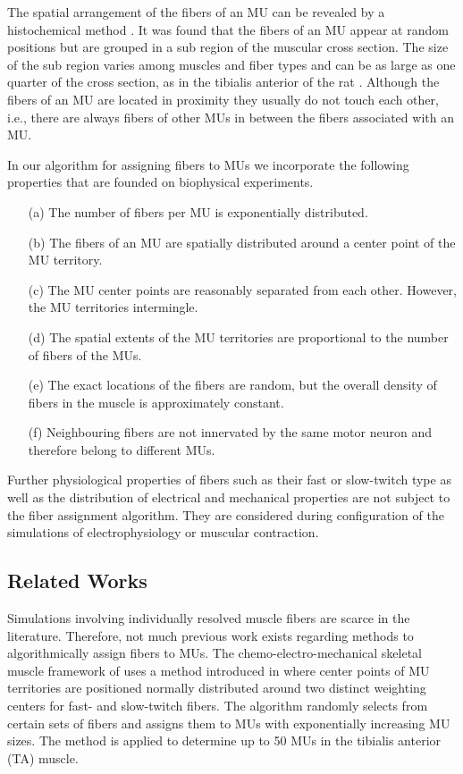 The spatial arrangement of the fibers of an MU can be revealed by a histochemical method \cite{brandstater1969histochemical}. It was found that the fibers of an MU appear at random positions but are grouped in a sub region of the muscular cross section. The size of the sub region varies among muscles and fiber types and can be as large as one quarter of the cross section, as in the tibialis anterior of the rat \cite{Edstrom1968}. Although the fibers of an MU are located in proximity they usually do not touch each other, i.e., there are always fibers of other MUs in between the fibers associated with an MU.

In our algorithm for assigning fibers to MUs we incorporate the following properties that are founded on biophysical experiments. 
\begin{itemize}
\item[(a)] The number of fibers per MU is  exponentially distributed. 
\item[(b)] The fibers of an MU are spatially distributed around a center point of the MU territory.
\item[(c)] The MU center points are reasonably separated from each other. However, the MU territories intermingle. 
\item[(d)] The spatial extents of the MU territories are proportional to the number of fibers of the MUs. 
\item[(e)] The exact locations of the fibers are random, but the overall density of fibers in the muscle is approximately constant. 
\item[(f)] Neighbouring fibers are not innervated by the same motor neuron and therefore belong to different MUs.
\end{itemize}

Further physiological properties of fibers such as their fast or slow-twitch type as well as the distribution of electrical and mechanical properties are not subject to the fiber assignment algorithm. They are considered during configuration of the simulations of electrophysiology or muscular contraction.

\subsection{Related Works}
Simulations involving individually resolved muscle fibers are scarce in the literature. Therefore, not much previous work exists regarding methods to algorithmically assign fibers to MUs. The chemo-electro-mechanical skeletal muscle framework of \cite{Heidlauf2013} uses a method introduced in \cite{Roehrle2012} where center points of MU territories are positioned normally distributed around two distinct weighting centers for fast- and slow-twitch fibers. 
The algorithm randomly selects from certain sets of fibers and assigns them to MUs with exponentially increasing MU sizes. 
The method is applied to determine up to 50 MUs in the tibialis anterior (TA) muscle.

